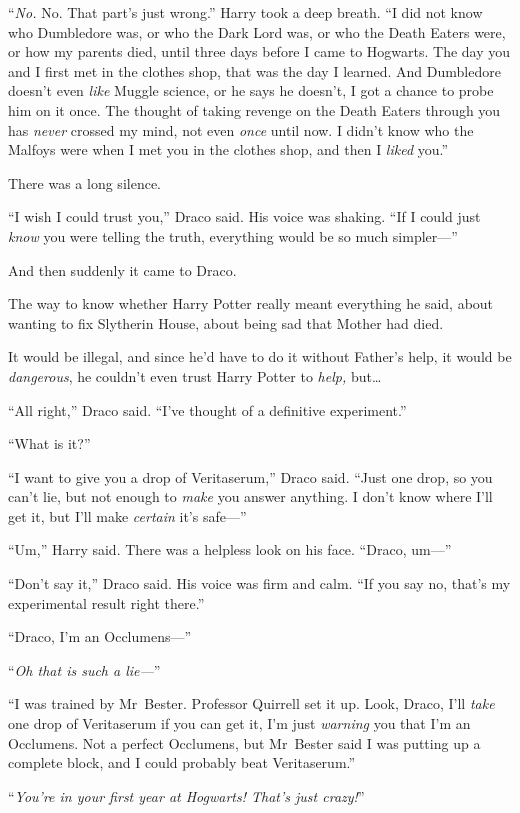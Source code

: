 “\emph{No.} No. That part’s just wrong.” Harry took a deep breath. “I did not know who Dumbledore was, or who the Dark Lord was, or who the Death Eaters were, or how my parents died, until three days before I came to Hogwarts. The day you and I first met in the clothes shop, that was the day I learned. And Dumbledore doesn’t even \emph{like} Muggle science, or he says he doesn’t, I got a chance to probe him on it once. The thought of taking revenge on the Death Eaters through you has \emph{never} crossed my mind, not even \emph{once} until now. I didn’t know who the Malfoys were when I met you in the clothes shop, and then I \emph{liked} you.”

There was a long silence.

“I wish I could trust you,” Draco said. His voice was shaking. “If I could just \emph{know} you were telling the truth, everything would be so much simpler—”

And then suddenly it came to Draco.

The way to know whether Harry Potter really meant everything he said, about wanting to fix Slytherin House, about being sad that Mother had died.

It would be illegal, and since he’d have to do it without Father’s help, it would be \emph{dangerous}, he couldn’t even trust Harry Potter to \emph{help,} but…

“All right,” Draco said. “I’ve thought of a definitive experiment.”

“What is it?”

“I want to give you a drop of Veritaserum,” Draco said. “Just one drop, so you can’t lie, but not enough to \emph{make} you answer anything. I don’t know where I’ll get it, but I’ll make \emph{certain} it’s safe—”

“Um,” Harry said. There was a helpless look on his face. “Draco, um—”

“Don’t say it,” Draco said. His voice was firm and calm. “If you say no, that’s my experimental result right there.”

“Draco, I’m an Occlumens—”

“\emph{Oh that is such a lie—}”

“I was trained by Mr~Bester. Professor Quirrell set it up. Look, Draco, I’ll \emph{take} one drop of Veritaserum if you can get it, I’m just \emph{warning} you that I’m an Occlumens. Not a perfect Occlumens, but Mr~Bester said I was putting up a complete block, and I could probably beat Veritaserum.”

“\emph{You’re in your first year at Hogwarts! That’s just crazy!}”

